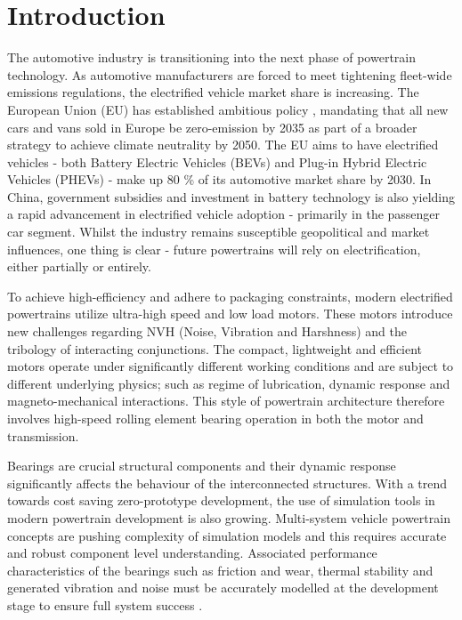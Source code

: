 \chapter{Introduction} \label{Introduction}

The automotive industry is transitioning into the next phase of powertrain technology. As automotive manufacturers are forced to meet tightening fleet-wide emissions regulations, the electrified vehicle market share is increasing. The European Union (EU) has established ambitious policy \cite{EUL110/5}, mandating that all new cars and vans sold in Europe be zero-emission by 2035 as part of a broader strategy to achieve climate neutrality by 2050. The EU aims to have electrified vehicles - both Battery Electric Vehicles (BEVs) and Plug-in Hybrid Electric Vehicles (PHEVs) - make up 80 \% of its automotive market share by 2030. In China, government subsidies and investment in battery technology is also yielding a rapid advancement in electrified vehicle adoption - primarily in the passenger car segment. Whilst the industry remains susceptible geopolitical and market influences, one thing is clear - future powertrains will rely on electrification, either partially or entirely.

To achieve high-efficiency and adhere to packaging constraints, modern electrified powertrains utilize ultra-high speed and low load motors. These motors introduce new challenges regarding NVH (Noise, Vibration and Harshness) and the tribology of interacting conjunctions. The compact, lightweight and efficient motors operate under significantly different working conditions and are subject to different underlying physics; such as regime of lubrication, dynamic response and magneto-mechanical interactions. This style of powertrain architecture therefore involves high-speed rolling element bearing operation in both the motor and transmission.

Bearings are crucial structural components and their dynamic response significantly affects the behaviour of the interconnected structures. With a trend towards cost saving zero-prototype development, the use of simulation tools in modern powertrain development is also growing. Multi-system vehicle powertrain concepts are pushing complexity of simulation models and this requires accurate and robust component level understanding. Associated performance characteristics of the bearings such as friction and wear, thermal stability and generated vibration and noise must be accurately modelled at the development stage to ensure full system success \cite{Wensing1972a}.


